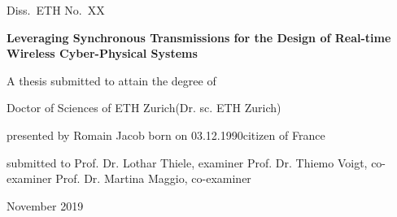 \newcommand{\dissnumstring}{XX}
\newcommand{\titlestring}{XX}
\newcommand{\titlestringNOBR}{%
Leveraging Synchronous Transmissions for the Design of Real-time Wireless Cyber-Physical Systems
%
}

\newcommand{\degreestring}{Doctor of Sciences of ETH Zurich}
\newcommand{\degreestringabr}{(Dr. sc. ETH Zurich)}
\newcommand{\authorstring}{Romain Jacob}
\newcommand{\acatitlestring}{M.Sc. École Normale Supérieure de Cachan}
\newcommand{\dateofbirthstring}{03.12.1990}
\newcommand{\citizenstringA}{France}
\newcommand{\examinerstring}{Prof. Dr. Lothar Thiele}
\newcommand{\coexaminerstringA}{Prof. Dr. Thiemo Voigt}
\newcommand{\coexaminerstringB}{Prof. Dr. Martina Maggio}
\newcommand{\datestring}{November 2019}

\begin{titlepage}
{
\sffamily\setlength{\baselineskip}{10mm}

\begin{centerline}
{\large\noindent Diss.\ ETH No.\ \dissnumstring}
\end{centerline}
\vfill

\begin{center}
\LARGE\bfseries
\titlestringNOBR
\end{center}
\vfill

\begin{center}
\large A thesis submitted to attain the degree of
\end{center}
\vspace{0.55\fill}

\begin{center}
\large \degreestring \linebreak \degreestringabr
\end{center}
\vspace{0.55\fill}

\begin{center}
\large presented by \linebreak \authorstring %
\linebreak \linebreak born on \dateofbirthstring \linebreak citizen of
\citizenstringA
\end{center}
\vspace{3\fill}

\begin{center}
\large submitted to \linebreak
\examinerstring, examiner \linebreak
\coexaminerstringA, co-examiner \linebreak
\coexaminerstringB, co-examiner
\end{center}
\vspace{0.55\fill}

\begin{center}
\large{\datestring}
\end{center}
}
\end{titlepage}
